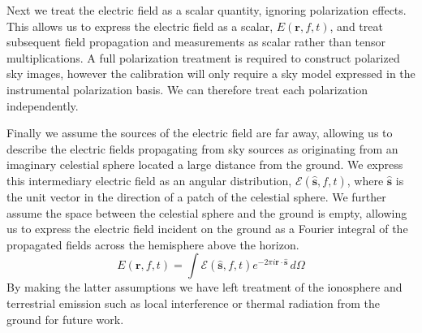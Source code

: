 \documentclass[a4paper,fleqn,usenatbib]{mnras}
\begin{document}
Next we treat the electric field as a scalar quantity, ignoring polarization effects. This allows us 
to express the electric field as a scalar, $E(\mathbf{r},f,t)$, and treat subsequent field 
propagation and measurements as scalar rather than tensor multiplications. A full polarization 
treatment is required to construct polarized sky images, however the calibration will only 
require a sky model expressed in the instrumental polarization basis. We can therefore treat 
each polarization independently.

Finally we assume the sources of the electric field are far away, allowing us to describe the 
electric fields propagating from sky sources as originating from an imaginary celestial sphere 
located a large distance from the ground. We express this intermediary electric field as an 
angular distribution, $\mathcal{E}(\hat{\mathbf{s}},f,t)$, where $\hat{\mathbf{s}}$ is the unit 
vector in the direction of a patch of the celestial sphere. We further assume the space between 
the celestial sphere and the ground is empty, allowing us to express the electric field incident 
on the ground as a Fourier integral of the propagated fields across the hemisphere above the horizon.
\begin{equation}\label{eq:sky_propagated}
E(\mathbf{r},f,t) = \int \mathcal{E}(\hat{\mathbf{s}},f,t) e^{-2\pi i \mathbf{r} \cdot \hat{\mathbf{s}}}\, d\Omega
\end{equation}  
By making the latter assumptions we have left treatment of the ionosphere and terrestrial 
emission such as local interference or thermal radiation from the ground for future work. 
\end{document}
